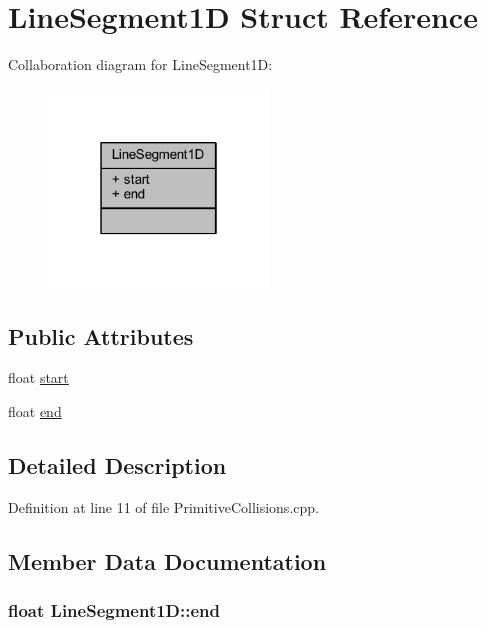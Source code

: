 \hypertarget{struct_line_segment1_d}{}\section{Line\+Segment1D Struct Reference}
\label{struct_line_segment1_d}


Collaboration diagram for Line\+Segment1D\+:\nopagebreak
\begin{figure}[H]
\begin{center}
\leavevmode
\includegraphics[width=166pt]{struct_line_segment1_d__coll__graph}
\end{center}
\end{figure}
\subsection*{Public Attributes}
\begin{DoxyCompactItemize}
\item 
float \hyperlink{struct_line_segment1_d_a19765c9df2cc0037c58783590e5f3216}{start}
\item 
float \hyperlink{struct_line_segment1_d_ae1b9e6c9278caa3a1a07bab469968dd8}{end}
\end{DoxyCompactItemize}


\subsection{Detailed Description}


Definition at line 11 of file Primitive\+Collisions.\+cpp.



\subsection{Member Data Documentation}
\subsubsection[{\texorpdfstring{end}{end}}]{\setlength{\rightskip}{0pt plus 5cm}float Line\+Segment1\+D\+::end}\hypertarget{struct_line_segment1_d_ae1b9e6c9278caa3a1a07bab469968dd8}{}\label{struct_line_segment1_d_ae1b9e6c9278caa3a1a07bab469968dd8}


